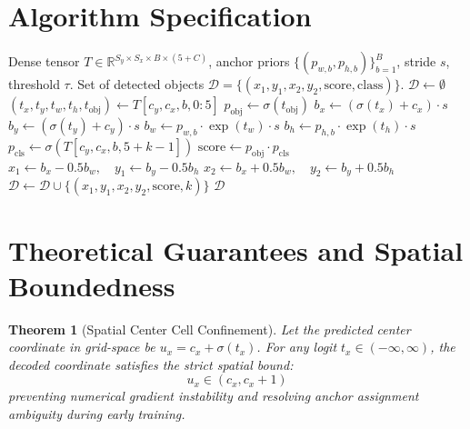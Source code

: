 \documentclass[11pt,a4paper]{article}
\newtheorem{theorem}{Theorem}
\theoremstyle{definition}
\begin{document}
\section{Algorithm Specification}

\begin{algorithm}[H]
\caption{Single-Stage Dense Grid Decoder}
\label{alg:yolo_decode}
\begin{algorithmic}[1]
\Require Dense tensor $T \in \mathbb{R}^{S_y \times S_x \times B \times (5 + C)}$, anchor priors $\{(p_{w, b}, p_{h, b})\}_{b=1}^B$, stride $s$, threshold $\tau$.
\Ensure Set of detected objects $\mathcal{D} = \{(x_1, y_1, x_2, y_2, \text{score}, \text{class})\}$.
\State $\mathcal{D} \gets \emptyset$
            \State $(t_x, t_y, t_w, t_h, t_{\text{obj}}) \gets T[c_y, c_x, b, 0:5]$
            \State $p_{\text{obj}} \gets \sigma(t_{\text{obj}})$
            \State $b_x \gets (\sigma(t_x) + c_x) \cdot s$
            \State $b_y \gets (\sigma(t_y) + c_y) \cdot s$
            \State $b_w \gets p_{w, b} \cdot \exp(t_w) \cdot s$
            \State $b_h \gets p_{h, b} \cdot \exp(t_h) \cdot s$
                \State $p_{\text{cls}} \gets \sigma(T[c_y, c_x, b, 5 + k - 1])$
                \State $\text{score} \gets p_{\text{obj}} \cdot p_{\text{cls}}$
                    \State $x_1 \gets b_x - 0.5 b_w, \quad y_1 \gets b_y - 0.5 b_h$
                    \State $x_2 \gets b_x + 0.5 b_w, \quad y_2 \gets b_y + 0.5 b_h$
                    \State $\mathcal{D} \gets \mathcal{D} \cup \{(x_1, y_1, x_2, y_2, \text{score}, k)\}$
                \EndIf
            \EndFor
        \EndFor
    \EndFor
\EndFor
\State \Return $\mathcal{D}$
\end{algorithmic}
\end{algorithm}

\section{Theoretical Guarantees and Spatial Boundedness}

\begin{theorem}[Spatial Center Cell Confinement]
\label{thm:grid_confinement}
Let the predicted center coordinate in grid-space be $u_x = c_x + \sigma(t_x)$. For any logit $t_x \in (-\infty, \infty)$, the decoded coordinate satisfies the strict spatial bound:
\begin{equation}
u_x \in (c_x, c_x + 1)
\end{equation}
preventing numerical gradient instability and resolving anchor assignment ambiguity during early training.
\end{theorem}
\end{document}
